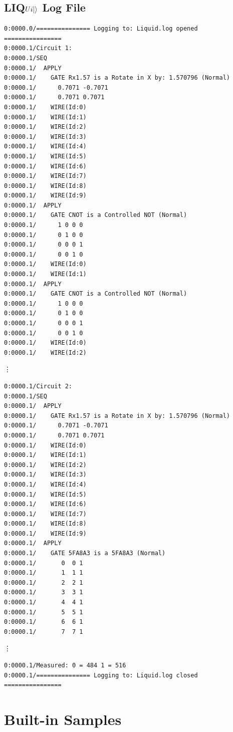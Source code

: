 \documentclass[12pt]{third-rep}
\begin{document}
\section{LIQ$Ui{\left\vert{}\right\rangle}$ Log File}
\begin{verbatim}
0:0000.0/=============== Logging to: Liquid.log opened ================
0:0000.1/Circuit 1:
0:0000.1/SEQ
0:0000.1/  APPLY
0:0000.1/    GATE Rx1.57 is a Rotate in X by: 1.570796 (Normal) 
0:0000.1/      0.7071 -0.7071 
0:0000.1/      0.7071 0.7071 
0:0000.1/    WIRE(Id:0)
0:0000.1/    WIRE(Id:1)
0:0000.1/    WIRE(Id:2)
0:0000.1/    WIRE(Id:3)
0:0000.1/    WIRE(Id:4)
0:0000.1/    WIRE(Id:5)
0:0000.1/    WIRE(Id:6)
0:0000.1/    WIRE(Id:7)
0:0000.1/    WIRE(Id:8)
0:0000.1/    WIRE(Id:9)
0:0000.1/  APPLY
0:0000.1/    GATE CNOT is a Controlled NOT (Normal) 
0:0000.1/      1 0 0 0 
0:0000.1/      0 1 0 0 
0:0000.1/      0 0 0 1 
0:0000.1/      0 0 1 0 
0:0000.1/    WIRE(Id:0)
0:0000.1/    WIRE(Id:1)
0:0000.1/  APPLY
0:0000.1/    GATE CNOT is a Controlled NOT (Normal) 
0:0000.1/      1 0 0 0 
0:0000.1/      0 1 0 0 
0:0000.1/      0 0 0 1 
0:0000.1/      0 0 1 0 
0:0000.1/    WIRE(Id:0)
0:0000.1/    WIRE(Id:2)
\end{verbatim}
\vdots
\begin{verbatim}
0:0000.1/Circuit 2:
0:0000.1/SEQ
0:0000.1/  APPLY
0:0000.1/    GATE Rx1.57 is a Rotate in X by: 1.570796 (Normal) 
0:0000.1/      0.7071 -0.7071 
0:0000.1/      0.7071 0.7071 
0:0000.1/    WIRE(Id:0)
0:0000.1/    WIRE(Id:1)
0:0000.1/    WIRE(Id:2)
0:0000.1/    WIRE(Id:3)
0:0000.1/    WIRE(Id:4)
0:0000.1/    WIRE(Id:5)
0:0000.1/    WIRE(Id:6)
0:0000.1/    WIRE(Id:7)
0:0000.1/    WIRE(Id:8)
0:0000.1/    WIRE(Id:9)
0:0000.1/  APPLY
0:0000.1/    GATE 5FA8A3 is a 5FA8A3 (Normal) 
0:0000.1/       0  0 1
0:0000.1/       1  1 1
0:0000.1/       2  2 1
0:0000.1/       3  3 1
0:0000.1/       4  4 1
0:0000.1/       5  5 1
0:0000.1/       6  6 1
0:0000.1/       7  7 1
\end{verbatim}
\vdots
\begin{verbatim}
0:0000.1/Measured: 0 = 484 1 = 516
0:0000.1/=============== Logging to: Liquid.log closed ================
\end{verbatim}

\chapter{Built-in Samples}
\end{document}
